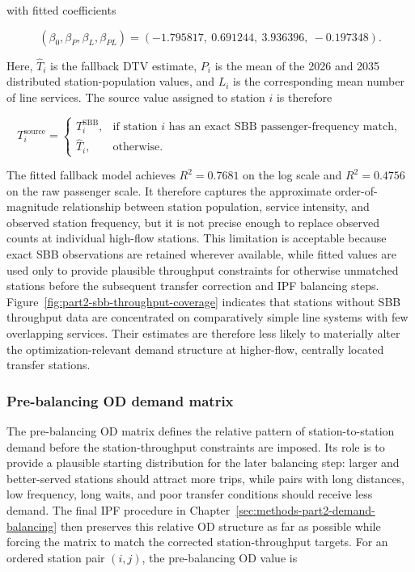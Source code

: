 \documentclass[preprint,12pt]{elsarticle}
\begin{document}
with fitted coefficients

\begin{equation}
(\beta_0,\beta_P,\beta_L,\beta_{PL})
=
(-1.795817,\ 0.691244,\ 3.936396,\ -0.197348).
\label{eq:part2-dtv-fallback-coefficients}
\end{equation}

Here, \(\widehat T_i\) is the fallback DTV estimate, \(P_i\) is the mean of the 2026 and 2035 distributed station-population values, and \(L_i\) is the corresponding mean number of line services. The source value assigned to station \(i\) is therefore

\begin{equation}
T_i^{\mathrm{source}}
=
\begin{cases}
T_i^{\mathrm{SBB}}, & \text{if station } i \text{ has an exact SBB passenger-frequency match},\\[4pt]
\widehat T_i, & \text{otherwise}.
\end{cases}
\label{eq:part2-dtv-source-assignment}
\end{equation}

The fitted fallback model achieves \(R^2=0.7681\) on the log scale and \(R^2=0.4756\) on the raw passenger scale. It therefore captures the approximate order-of-magnitude relationship between station population, service intensity, and observed station frequency, but it is not precise enough to replace observed counts at individual high-flow stations. This limitation is acceptable because exact SBB observations are retained wherever available, while fitted values are used only to provide plausible throughput constraints for otherwise unmatched stations before the subsequent transfer correction and IPF balancing steps. Figure~\ref{fig:part2-sbb-throughput-coverage} indicates that stations without SBB throughput data are concentrated on comparatively simple line systems with few overlapping services. Their estimates are therefore less likely to materially alter the optimization-relevant demand structure at higher-flow, centrally located transfer stations.


\subsubsection{Pre-balancing OD demand matrix}\label{sec:methods-part2-demand-seed}
The pre-balancing OD matrix defines the relative pattern of station-to-station demand before the station-throughput constraints are imposed. Its role is to provide a plausible starting distribution for the later balancing step: larger and better-served stations should attract more trips, while pairs with long distances, low frequency, long waits, and poor transfer conditions should receive less demand. The final IPF procedure in Chapter~\ref{sec:methods-part2-demand-balancing} then preserves this relative OD structure as far as possible while forcing the matrix to match the corrected station-throughput targets. For an ordered station pair \((i,j)\), the pre-balancing OD value is
\end{document}
